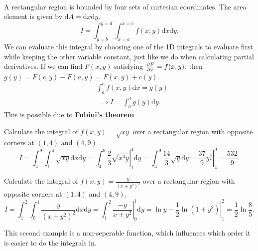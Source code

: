 \documentclass[../multivariate_calculus.tex]{subfiles}
\begin{document}
        \paragraph{}
        A rectangular region is bounded by four sets of cartesian coordinates.
        The area element is given by $\mathrm{d}A=\mathrm{d}x\mathrm{d}y$.
        \begin{equation}
            I=\int_{y=b}^{y=d}\int_{x=a}^{x=c}f(x,y)\mathrm{d}x\mathrm{d}y.
        \end{equation}
        We can evaluate this integral by choosing one of the 1D integrals to evaluate first while keeping the other variable constant, just like we do when calculating partial derivatives.
        If we can find $F(x,y)$ satisfying $\pdv{F}{x}=f(x,y)$, then $g(y)=F(c,y)-F(a,y)=F(x,y)+c(y)$.
        \begin{align}
            &\int_a^c f(x,y)\mathrm{d}x=g(y)\\
            &\implies I=\int_b^d g(y)\mathrm{d}y.
        \end{align}
        This is possible due to \textbf{Fubini's theorem}
        \begin{example}
            Calculate the integral of $f(x,y)=\sqrt{xy}$ over a rectangular region with opposite corners at $(1,4)$ and $(4,9)$.
            \begin{equation}
                I=\int_4^9\int_1^4\sqrt{xy}\mathrm{d}x\mathrm{d}y=\int_4^9\left.\frac{2}{3}\sqrt{x^3y}\right|_1^4\mathrm{d}y=\int_4^9\frac{14}{3}\sqrt{y}\mathrm{d}y=\left.\frac{37}{9}y^{\frac{3}{2}}\right|_4^9=\frac{532}{9}.
            \end{equation}
        \end{example}
        \begin{example}
            Calculate the integral of $f(x,y)=\frac{y}{(x+y^2)^2}$ over a rectangular region with opposite corners at $(1,4)$ and $(4,9)$.
            \begin{equation}
                I=\int_1^2\int_0^1\frac{y}{(x+y^2)^2}\mathrm{d}x\mathrm{d}y=\int_1^2\left.\frac{-y}{x+y^2}\right|_0^1\mathrm{d}y=\left.\ln y-\frac{1}{2}\ln(1+y^2)\right|_1^2=\frac{1}{2}\ln\frac{8}{5}.
            \end{equation}
        \end{example}
        This second example is a non-seperable function, which influences which order it is easier to do the integrals in.
\end{document}
